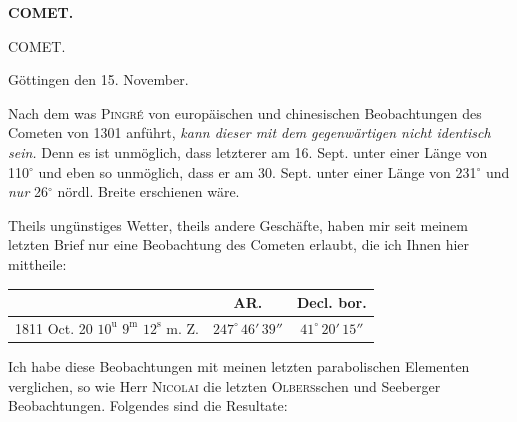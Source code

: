 \clearpage
\thispagestyle{empty}
\noindent{}%
\makebox[12mm][l]{}%
\parbox[t]{\dimexpr\linewidth-24mm\relax}{\centering\footnotesize\bfseries COMET.\par}%
\par\nobreak\medskip
\begin{center}
\large COMET.
\end{center}

\begin{flushright}Göttingen den 15. November.\end{flushright}
\par\indent Nach dem was \textsc{Pingré} von europäischen und chinesischen Beobachtungen des Cometen von 1301 anführt, \emph{kann dieser mit dem gegenwärtigen nicht identisch sein.} Denn es ist unmöglich, dass letzterer am 16. Sept. unter einer Länge von 110$^\circ$ und eben so unmöglich, dass er am 30. Sept. unter einer Länge von 231$^\circ$ und \emph{nur} 26$^\circ$ nördl. Breite erschienen wäre.


\par\indent Theils ungünstiges Wetter, theils andere Geschäfte, haben mir seit meinem letzten Brief nur eine Beobachtung des Cometen erlaubt, die ich Ihnen hier mittheile:

\begin{center}
\fontsize{10}{12}\selectfont\setlength{\tabcolsep}{3pt}\renewcommand{\arraystretch}{1.15}\begin{tabular}{l|c|c}
 & AR. & Decl. bor. \\ \hline
1811 Oct. 20 $10^{\mathrm u}$ $9^{\mathrm m}$ $12^{\mathrm s}$ m. Z. & $247^\circ\,46'\,39''$ & $41^\circ\,20'\,15''$ \\
\end{tabular}
\end{center}


\par\indent Ich habe diese Beobachtungen mit meinen letzten parabolischen Elementen verglichen, so wie Herr \textsc{Nicolai} die letzten \textsc{Olbers}schen und Seeberger Beobachtungen. Folgendes sind die Resultate:

